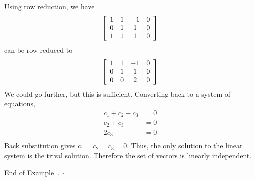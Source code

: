\documentclass[10pt]{article}
\newenvironment{augmentedmatrix}[1] %
{\left[\begin{array}{#1}}
    {\end{array}\right]}
\theoremstyle{definition}
\newtheorem{example}[theorem]{Example}
\renewenvironment{example}
{\begin{oldexample}}
  {\par\smallskip\hfill   End of Example~\theexample. $\square$    \par\end{oldexample}}
\begin{document}
\begin{example}
  Using row reduction, we have
  \begin{equation*}
    \begin{augmentedmatrix}{ccc|c}
      1&1&-1&0\\
      0&1&1&0\\
      1&1&1&0      
    \end{augmentedmatrix}
  \end{equation*}
  can be row reduced to
  \begin{equation*}
    \begin{augmentedmatrix}{ccc|c}
      1&1&-1&0\\
      0&1&1&0\\
      0&0&2&0      
    \end{augmentedmatrix}    
  \end{equation*}
  We could go further, but this is sufficient. Converting back to a system of equations,
  \begin{align*}
    c_{1}+c_{2}-c_{3}&=0 \\
    c_{2}+c_{3}&=0 \\
    2c_{3}&=0 \\
  \end{align*}
  Back substitution gives $c_{1}=c_{2}=c_{3}=0$. Thus, the only solution to
  the linear system is the trival solution. Therefore the set of vectors is
  linearly independent.
\end{example}
\end{document}
